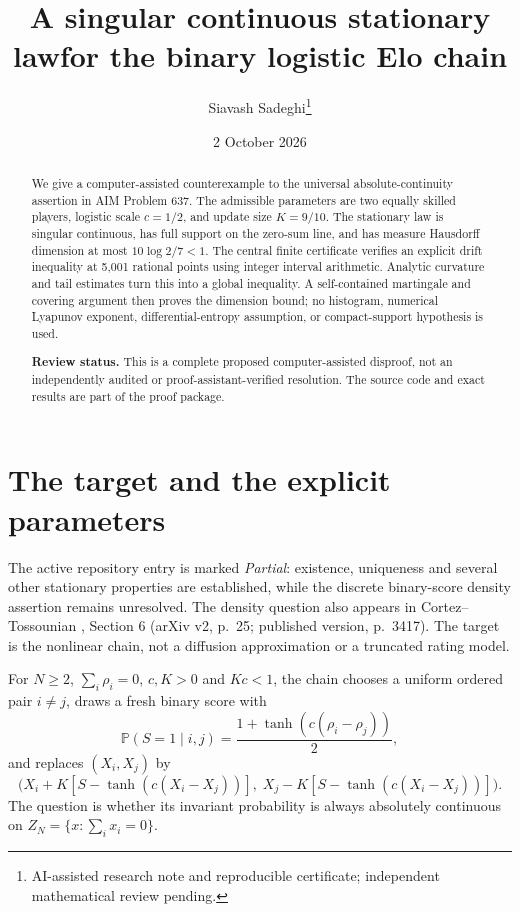 \documentclass[11pt]{article}
\title{A singular continuous stationary law\newline for the binary logistic Elo chain}
\author{Siavash Sadeghi\thanks{AI-assisted research note and reproducible certificate; independent mathematical review pending.}}
\date{2 October 2026}
\theoremstyle{remark}
\newcommand{\PP}{\mathbb P}
\begin{document}
\maketitle
\thispagestyle{fancy}
\begin{abstract}
We give a computer-assisted counterexample to the universal absolute-continuity assertion in AIM Problem 637. The admissible parameters are two equally skilled players, logistic scale $c=1/2$, and update size $K=9/10$. The stationary law is singular continuous, has full support on the zero-sum line, and has measure Hausdorff dimension at most $10\log 2/7<1$. The central finite certificate verifies an explicit drift inequality at 5,001 rational points using integer interval arithmetic. Analytic curvature and tail estimates turn this into a global inequality. A self-contained martingale and covering argument then proves the dimension bound; no histogram, numerical Lyapunov exponent, differential-entropy assumption, or compact-support hypothesis is used.

\textbf{Review status.} This is a complete proposed computer-assisted disproof, not an independently audited or proof-assistant-verified resolution. The source code and exact results are part of the proof package.
\end{abstract}

\section{The target and the explicit parameters}
The active repository entry \cite{aim} is marked \emph{Partial}: existence, uniqueness and several other stationary properties are established, while the discrete binary-score density assertion remains unresolved. The density question also appears in Cortez--Tossounian \cite{ct}, Section 6 (arXiv v2, p.~25; published version, p.~3417). The target is the nonlinear chain, not a diffusion approximation or a truncated rating model.

For $N\ge2$, $\sum_i\rho_i=0$, $c,K>0$ and $Kc<1$, the chain chooses a uniform ordered pair $i\ne j$, draws a fresh binary score with
\[
\PP(S=1\mid i,j)=\frac{1+\tanh(c(\rho_i-\rho_j))}{2},
\]
and replaces $(X_i,X_j)$ by
\[
\bigl(X_i+K[S-\tanh(c(X_i-X_j))],\;
X_j-K[S-\tanh(c(X_i-X_j))]\bigr).
\]
The question is whether its invariant probability is always absolutely continuous on $Z_N=\{x:\sum_i x_i=0\}$.
\end{document}
